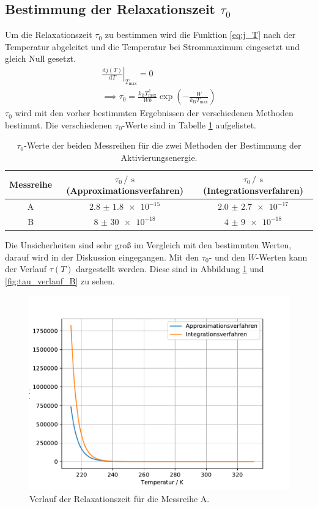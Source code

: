 \subsection{Bestimmung der Relaxationszeit \texorpdfstring{$\tau_{0}$}{T1}}
Um die Relaxationszeit $\tau_{0}$ zu bestimmen wird die Funktion \eqref{eq:j_T} nach der Temperatur abgeleitet und 
die Temperatur bei Strommaximum eingesetzt und gleich Null gesetzt.
\begin{gather*}
    \left.\frac{\text{d}j(T)}{\text{d}T}\right|_{T_{\text{max}}}=0\\
    \implies \tau_0 = \frac{k_{\text{B}}T_{\text{max}}^2}{Wb}\exp{\left(-\frac{W}{k_{\text{B}}T_{\text{max}}}\right)}
\end{gather*}
$\tau_0$ wird mit den vorher bestimmten Ergebnissen der verschiedenen Methoden bestimmt.
Die verschiedenen $\tau_0$-Werte sind in Tabelle \ref{tab:tau_0} aufgelistet.
\FloatBarrier
\begin{table}
    \centering
    \caption{$\tau_0$-Werte der beiden Messreihen für die zwei Methoden der Bestimmung der Aktivierungsenergie.}
    \label{tab:tau_0}
    \begin{tabular}{c c c}
        \toprule
        Messreihe&$\tau_0\,/\,\SI{}{\second}$ (Approximationsverfahren)&$\tau_0\,/\,\SI{}{\second}$ (Integrationsverfahren)\\
        \midrule
        A&$\num{2.8(18)e-15}$&$\num{2.0(27)e-17}$\\
        B&$\num{8(30)e-18}$&$\num{4(9)e-18}$\\
        \bottomrule
    \end{tabular}
\end{table}
\FloatBarrier
Die Unsicherheiten sind sehr groß im Vergleich mit den bestimmten Werten, darauf wird in der Diskussion eingegangen.
Mit den $\tau_0$- und den $W$-Werten kann der Verlauf $\tau(T)$ dargestellt werden.
Diese sind in Abbildung \ref{fig:tau_verlauf_A} und \ref{fig:tau_verlauf_B} zu sehen.
\FloatBarrier
\begin{figure}
    \centering
    \includegraphics[width = \textwidth , keepaspectratio]{figure/tau_verlauf_A.pdf}
    \caption{Verlauf der Relaxationszeit für die Messreihe A.}
    \label{fig:tau_verlauf_A}
\end{figure}
